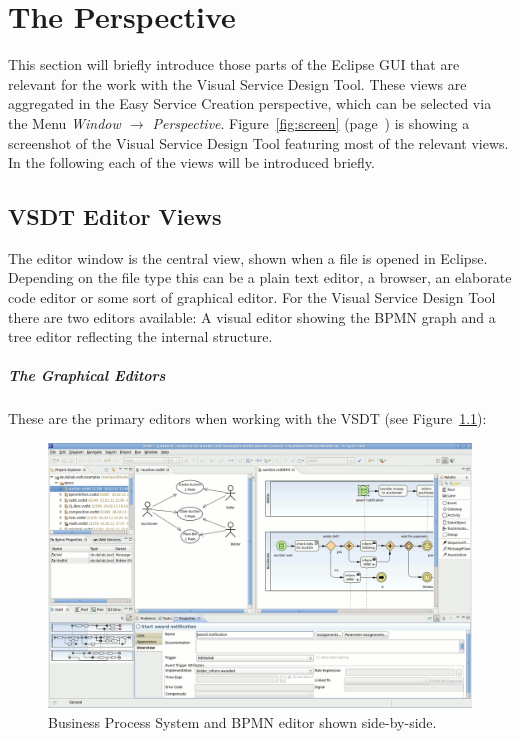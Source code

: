 \chapter{The Perspective}
\label{sec:user_perspective}

This section will briefly introduce those parts of the Eclipse GUI that are
relevant for the work with the Visual Service Design Tool.  These views are
aggregated in the Easy Service Creation perspective, which can be selected via
the Menu \emph{Window $\rightarrow$ Perspective}.  Figure~\ref{fig:screen}
(page~\pageref{fig:screen}) is showing a screenshot of the Visual Service Design
Tool featuring most of the relevant views.  In the following each of the views
will be introduced briefly.



\section{VSDT Editor Views}

The editor window is the central view, shown when a file is opened in Eclipse.
Depending on the file type this can be a plain text editor, a browser, an elaborate
code editor or some sort of graphical editor.  For the Visual Service Design Tool
there are two editors available: A visual editor showing the BPMN graph and a
tree editor reflecting the internal structure.

\paragraph*{The Graphical Editors}
These are the primary editors when working with the VSDT (see Figure~\ref{fig:screen_meta}):

\begin{figure}
	\centering
	\includegraphics[height=.4\textheight]{figures/vsdt_1-4-0_meta.png}
	\caption{Business Process System and BPMN editor shown side-by-side.}
	\label{fig:screen_meta}
\end{figure}

